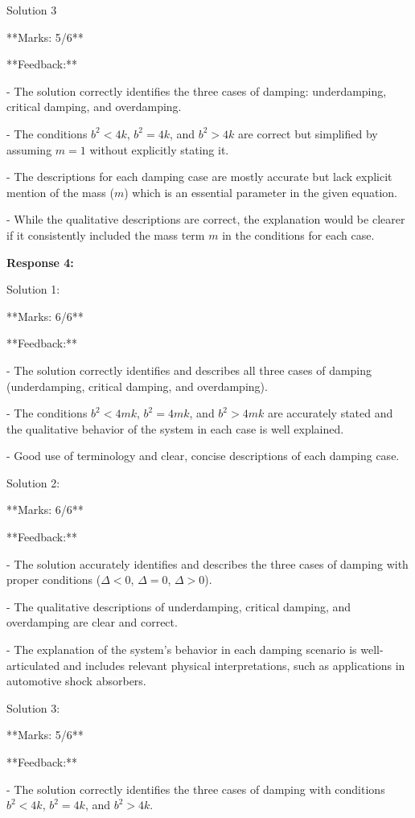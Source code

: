 \documentclass[a4paper,11pt]{article}
\begin{document}
Solution 3

**Marks: 5/6**

**Feedback:**

- The solution correctly identifies the three cases of damping: underdamping, critical damping, and overdamping.

- The conditions \(b^2 < 4k\), \(b^2 = 4k\), and \(b^2 > 4k\) are correct but simplified by assuming \(m=1\) without explicitly stating it.

- The descriptions for each damping case are mostly accurate but lack explicit mention of the mass (\(m\)) which is an essential parameter in the given equation.

- While the qualitative descriptions are correct, the explanation would be clearer if it consistently included the mass term \(m\) in the conditions for each case.

\bigskip
\textbf{Response 4:}

Solution 1:

**Marks: 6/6**

**Feedback:**

- The solution correctly identifies and describes all three cases of damping (underdamping, critical damping, and overdamping).

- The conditions \(b^2 < 4mk\), \(b^2 = 4mk\), and \(b^2 > 4mk\) are accurately stated and the qualitative behavior of the system in each case is well explained.

- Good use of terminology and clear, concise descriptions of each damping case.
  
Solution 2:

**Marks: 6/6**

**Feedback:**

- The solution accurately identifies and describes the three cases of damping with proper conditions (\(\Delta < 0\), \(\Delta = 0\), \(\Delta > 0\)).

- The qualitative descriptions of underdamping, critical damping, and overdamping are clear and correct.

- The explanation of the system's behavior in each damping scenario is well-articulated and includes relevant physical interpretations, such as applications in automotive shock absorbers.
  
Solution 3:

**Marks: 5/6**

**Feedback:**

- The solution correctly identifies the three cases of damping with conditions \(b^2 < 4k\), \(b^2 = 4k\), and \(b^2 > 4k\).
\end{document}
